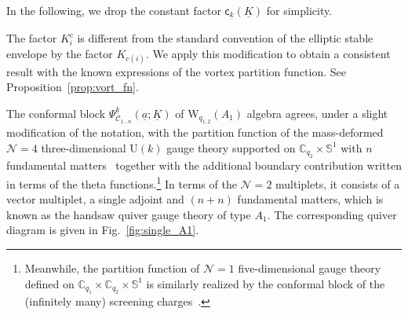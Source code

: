 In the following, we drop the constant factor $\mathsf{c}_{\underline{k}}(\underline{K})$ for simplicity.

\begin{remark}
    The factor $K_i^c$ is different from the standard convention of the elliptic stable envelope by the factor $K_{c(i)}$. 
    We apply this modification to obtain a consistent result with the known expressions of the vortex partition function. See Proposition~\ref{prop:vort_fn}.
\end{remark}

The conformal block $\Psi_{\mathscr{C}_{1\ldots n}}^{\underline{k}}(\underline{a};\underline{K})$ of W$_{q_{1,2}}(A_1)$ algebra agrees, under a slight modification of the notation, with the partition function of the mass-deformed $\mathcal{N}=4$ three-dimensional $\mathrm{U}(k)$ gauge theory supported on $\mathbb{C}_{q_2} \times \mathbb{S}^1$ with $n$ fundamental matters~\cite{Aganagic:2013tta,Aganagic:2014oia,Aganagic:2015cta} together with the additional boundary contribution written in terms of the theta functions.\footnote{Meanwhile, the partition function of $\mathcal{N}=1$ five-dimensional gauge theory defined on $\mathbb{C}_{q_1} \times \mathbb{C}_{q_2} \times \mathbb{S}^1$ is similarly realized by the conformal block of the (infinitely many) screening charges~\cite{Kimura:2015rgi}.
}
In terms of the $\mathcal{N}=2$ multiplets, it consists of a vector multiplet, a single adjoint and $(n+n)$ fundamental matters, which is known as the handsaw quiver gauge theory of type $A_1$.
The corresponding quiver diagram is given in Fig.~\ref{fig:single_A1}.

